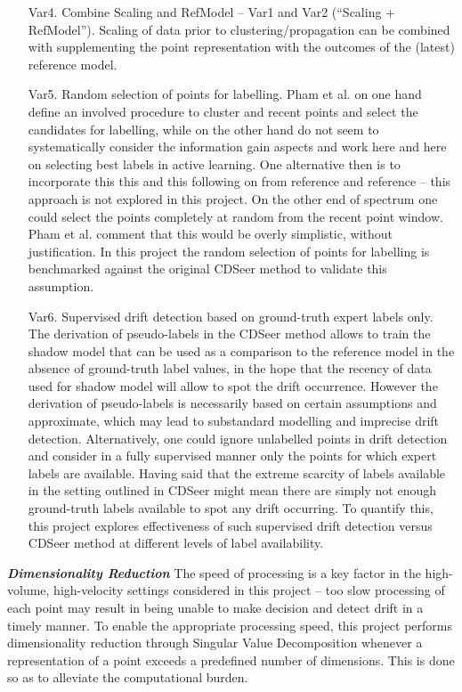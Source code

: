 \documentclass{svproc}
\begin{document}
\begin{itemize}
\item[Var4.]Combine Scaling and RefModel – Var1 and Var2 (“Scaling + RefModel”). Scaling of data prior to clustering/propagation can be combined with supplementing the point representation with the outcomes of the (latest) reference model. 

\item[Var5.]Random selection of points for labelling. Pham et al. \cite{pham2025} on one hand define an involved procedure to cluster and recent points and select the candidates for labelling, while on the other hand do not seem to systematically consider the information gain aspects and work here and here on selecting best labels in active learning. One alternative then is to incorporate this this and this following on from reference and reference – this approach is not explored in this project. On the other end of spectrum one could select the points completely at random from the recent point window. Pham et al. \cite{pham2025} comment that this would be overly simplistic, without justification. In this project the random selection of points for labelling is benchmarked against the original CDSeer method to validate this assumption.

\item[Var6.]Supervised drift detection based on ground-truth expert labels only. The derivation of pseudo-labels in the CDSeer method allows to train the shadow model that can be used as a comparison to the reference model in the absence of ground-truth label values, in the hope that the recency of data used for shadow model will allow to spot the drift occurrence. However the derivation of pseudo-labels is necessarily based on certain assumptions and approximate, which may lead to substandard modelling and imprecise drift detection. Alternatively, one could ignore unlabelled points in drift detection and consider in a fully supervised manner only the points for which expert labels are available. Having said that the extreme scarcity of labels available in the setting outlined in CDSeer might mean there are simply not enough ground-truth labels available to spot any drift occurring. To quantify this, this project explores effectiveness of such supervised drift detection versus CDSeer method at different levels of label availability.

\end{itemize}

\textbf{\textit{Dimensionality Reduction}} The speed of processing is a key factor in the high-volume, high-velocity settings considered in this project – too slow processing of each point may result in being unable to make decision and detect drift in a timely manner. To enable the appropriate processing speed, this project performs dimensionality reduction through Singular Value Decomposition whenever a representation of a point exceeds a predefined number of dimensions. This is done so as to alleviate the computational burden.
\end{document}

